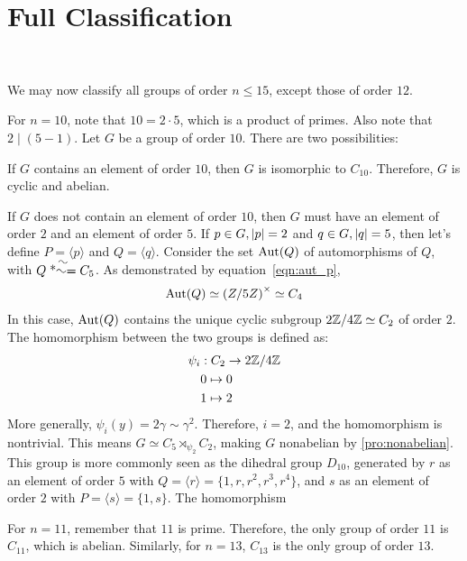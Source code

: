 \section{Full Classification}~\label{sec:class}

We may now classify all groups of order $n \le 15$, except those of order $12$.

For $n = 10$, note that $10 = 2 \cdot 5$, which is a product of primes.
Also note that $2 \mid (5 - 1)$.
Let $G$ be a group of order $10$.
There are two possibilities:
\begin{enumalph}
  \item If $G$ contains an element of order $10$, then $G$ is isomorphic to $C_{10}$.
    Therefore, $G$ is cyclic and abelian.
  \item If $G$ does not contain an element of order $10$,
    then $G$ must have an element of order $2$ and an element of order $5$.
    If $p \in G, \lvert p\rvert = 2$ and $q \in G, \lvert q\rvert = 5$,
    then let's define $P = \langle p \rangle$ and $Q = \langle q \rangle$.
    Consider the set $\operatorname{Aut}(Q)$ of automorphisms of $Q$, with $Q \isom C_5$.
    As demonstrated by equation~\ref{eqn:aut_p},
    \begin{align}
      \operatorname{Aut}(Q) \simeq {(Z/5Z)}^\times \simeq C_4
    \end{align}
    In this case, $\operatorname{Aut}(Q)$ contains the unique cyclic subgroup $2\mathbb{Z}/4\mathbb{Z} \simeq C_2$
    of order $2$. The homomorphism between the two groups is defined as:
    \begin{align*}
      \psi_i &: C_2 \to 2\mathbb{Z}/4\mathbb{Z} \\
           & 0 \mapsto 0 \\
           & 1 \mapsto 2 \\
    \end{align*}
    More generally, $\psi_i (y) = 2 \gamma \sim \gamma^2$.
    Therefore, $i = 2$, and the homomorphism is nontrivial.
    This means $G \simeq C_5 \rtimes_{\psi_2} C_2$, making $G$ nonabelian
    by \ref{pro:nonabelian}.
    This group is more commonly seen as the dihedral group $D_{10}$,
    generated by $r$ as an element of order $5$ with
    $Q = \langle r \rangle = \{ 1, r, r^2, r^3, r^4 \}$,
    and $s$ as an element of order $2$ with $P = \langle s \rangle = \{ 1, s \}$.
    The homomorphism 
\end{enumalph}

For $n = 11$, remember that $11$ is prime.
Therefore, the only group of order $11$ is $C_{11}$, which is abelian.
Similarly, for $n = 13$, $C_{13}$ is the only group of order $13$.

